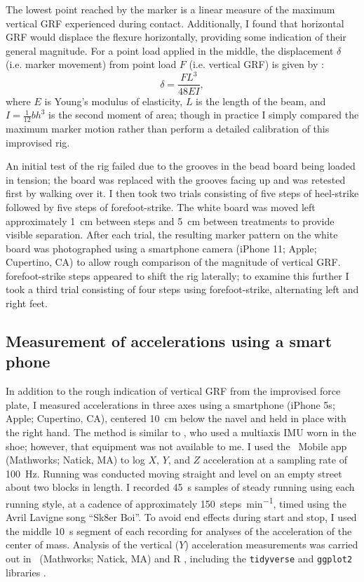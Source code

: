 The lowest point reached by the marker is a linear measure of the maximum vertical GRF experienced during contact. Additionally, I found that horizontal GRF would displace the flexure horizontally, providing some indication of their general magnitude. For a point load applied in the middle, the displacement $\delta$ (i.e. marker movement) from point load $F$ (i.e. vertical GRF) is given by \cite{craig2011mechanics}: 
\begin{equation}
\delta = \frac{FL^3}{48 EI},
\label{eq:sensor-response}
\end{equation}
where $E$ is Young's modulus of elasticity, $L$ is the length of the beam, and $I=\frac{1}{12}bh^3$ is the second moment of area; though in practice I simply compared the maximum marker motion rather than perform a detailed calibration of this improvised rig. 

An initial test of the rig failed due to the grooves in the bead board being loaded in tension; the board was replaced with the grooves facing up and was retested first by walking over it. I then took two trials consisting of five steps of heel-strike followed by five steps of forefoot-strike. The white board was moved left approximately \SI{1}{\centi\meter} between steps and \SI{5}{\centi\meter} between treatments to provide visible separation. After each trial, the resulting marker pattern on the white board was photographed using a smartphone camera (iPhone 11; Apple; Cupertino, CA) to allow rough comparison of the magnitude of vertical GRF. forefoot-strike steps appeared to shift the rig laterally; to examine this further I took a third trial consisting of four steps using forefoot-strike, alternating left and right feet. 




\subsection{Measurement of accelerations using a smart phone}
In addition to the rough indication of vertical GRF from the improvised force plate, I measured accelerations in three axes using a smartphone (iPhone 5s; Apple; Cupertino, CA), centered \SI{10}{\centi\meter} below the navel and held in place with the right hand. The method is similar to \citet{shiang2016determine}, who used a multiaxis IMU worn in the shoe; however, that equipment was not available to me. I used the \Matlab\ Mobile app (Mathworks; Natick, MA) to log $X$, $Y$, and $Z$ acceleration at a sampling rate of \SI{100}{\hertz}.  Running was conducted moving straight and level on an empty street about two blocks in length. I recorded \SI{45}{\second} samples of steady running using each running style, at a cadence of approximately \SI{150}{steps\per\minute}, timed using the Avril Lavigne song ``Sk8er Boi''. To avoid end effects during start and stop, I used the middle \SI{10}{\second} segment of each recording for analyses of the acceleration of the center of mass. Analysis of the vertical ($Y$) acceleration measurements was carried out in \Matlab\ (Mathworks; Natick, MA) and R \citep{r2020}, including the \lstinline{tidyverse} and \lstinline{ggplot2} libraries \citep{wickham2019tidyverse}. 



